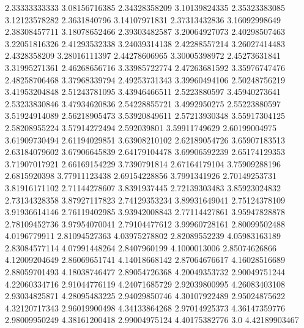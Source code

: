   2.33333333333    3.08156716385
  2.34328358209    3.10139824335
  2.35323383085    3.12123578282
   2.3631840796    3.14107971831
  2.37313432836    3.16092998649
  2.38308457711    3.18078652466
  2.39303482587    3.20064927073
  2.40298507463    3.22051816326
  2.41293532338    3.24039314138
  2.42288557214    3.26027414483
   2.4328358209    3.28016111397
  2.44278606965    3.30005398972
  2.45273631841    3.31995271361
  2.46268656716    3.33985722774
  2.47263681592    3.35976747476
  2.48258706468    3.37968339794
  2.49253731343    3.39960494106
  2.50248756219    3.41953204848
  2.51243781095    3.43946466511
   2.5223880597    3.45940273641
  2.53233830846    3.47934620836
  2.54228855721     3.4992950275
  2.55223880597    3.51924914089
  2.56218905473    3.53920849611
  2.57213930348    3.55917304125
  2.58208955224    3.57914272494
    2.592039801    3.59911749629
  2.60199004975    3.61909730494
  2.61194029851    3.63908210102
  2.62189054726    3.65907183513
  2.63184079602    3.67906645839
  2.64179104478    3.69906592239
  2.65174129353    3.71907017921
  2.66169154229     3.7390791814
  2.67164179104    3.75909288196
   2.6815920398    3.77911123438
  2.69154228856     3.7991341926
  2.70149253731    3.81916171102
  2.71144278607     3.8391937445
  2.72139303483    3.85923024832
  2.73134328358    3.87927117823
  2.74129353234    3.89931649041
  2.75124378109    3.91936614146
  2.76119402985    3.93942008843
  2.77114427861    3.95947828878
  2.78109452736    3.97954070041
  2.79104477612    3.99960728161
  2.80099502488     4.0196779911
  2.81094527363    4.03975278802
  2.82089552239    4.05983163189
  2.83084577114    4.07991448264
   2.8407960199     4.1000013006
  2.85074626866    4.12009204649
  2.86069651741    4.14018668142
  2.87064676617    4.16028516689
  2.88059701493    4.18038746477
  2.89054726368    4.20049353732
  2.90049751244    4.22060334716
  2.91044776119    4.24071685729
  2.92039800995    4.26083403108
  2.93034825871    4.28095483225
  2.94029850746    4.30107922489
  2.95024875622    4.32120717343
  2.96019900498    4.34133864268
  2.97014925373    4.36147359776
  2.98009950249    4.38161200418
  2.99004975124    4.40175382776
            3.0    4.42189903467
